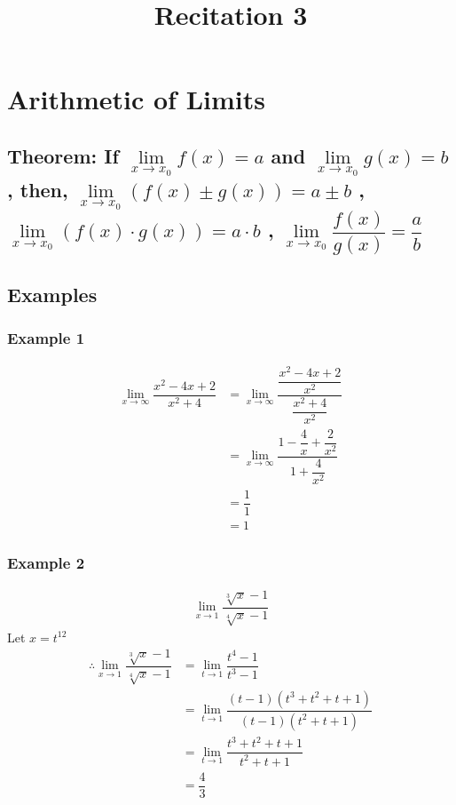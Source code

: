 \documentclass[fleqn]{article}
\title{Recitation 3}
\author{}
\date{\formatdate{12}{11}{2014}}
\begin{document}
\maketitle

\tableofcontents

\newpage
\section{Arithmetic of Limits}

\subsection{Theorem: If $\lim\limits_{x \rightarrow x_0} f(x) = a$ and $\lim\limits_{x \rightarrow x_0} g(x) = b$ , then, $\lim\limits_{x \rightarrow x_0} (f(x) \pm g(x)) = a \pm b$ , $\lim\limits_{x \rightarrow x_0} (f(x) \cdot g(x)) = a \cdot b$ , $\lim\limits_{x \rightarrow x_0} \dfrac{f(x)}{g(x)} = \dfrac{a}{b}$}

\subsection{Examples}

\subsubsection{Example 1}

\begin{align*}
	\lim\limits_{x \rightarrow \infty} \dfrac{x^2 - 4x + 2}{x^2 + 4} &= \lim\limits_{x \rightarrow \infty} \dfrac{\dfrac{x^2 - 4x +2}{x^2}}{\dfrac{x^2 + 4}{x^2}} \\
	&= \lim\limits_{x \rightarrow \infty} \dfrac{1 - \dfrac{4}{x} + \dfrac{2}{x^2}}{1 + \dfrac{4}{x^2}} \\
	&= \dfrac{1}{1} \\
	&= 1
\end{align*}

\subsubsection{Example 2}

\begin{align*}
	\lim\limits_{x \rightarrow 1} \dfrac{\sqrt[3]{x} - 1}{\sqrt[4]{x} - 1}
\end{align*}
Let $x = t^12$
\begin{align*}
	\therefore \lim\limits_{x \rightarrow 1} \dfrac{\sqrt[3]{x} - 1}{\sqrt[4]{x} - 1} &= \lim\limits_{t \rightarrow 1} \dfrac{t^4 - 1}{t^3 - 1} \\
	&= \lim\limits_{t \rightarrow 1} \dfrac{(t-1)(t^3 + t^2 + t + 1)}{(t-1)(t^2 + t + 1)} \\
	&= \lim\limits_{t \rightarrow 1} \dfrac{t^3 + t^2 + t + 1}{t^2 + t + 1} \\
	&= \dfrac{4}{3}
\end{align*}
\end{document}
